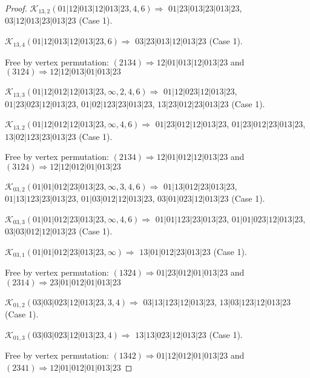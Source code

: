 \documentclass[12pt]{article}
\theoremstyle{plain}
\theoremstyle{definition}
\theoremstyle{remark}
\newcommand{\fancy}[1]{\mathcal{#1}}
\def\K{\fancy{K}}
\begin{document}
\begin{proof}
	\bigskip
	
	$\K_{13,2}(01|12|013|12|013|23,4, 6)\Rightarrow $ $01|23|013|23|013|23$, $03|12|013|23|013|23$ (Case 1).
	
	$\K_{13,4}(01|12|013|12|013|23,6)\Rightarrow $ $03|23|013|12|013|23$ (Case 1).
	
	
	
	Free by vertex permutation: $(2 1 3 4)\Rightarrow 12|01|013|12|013|23$ and $(3 1 2 4)\Rightarrow 12|12|013|01|013|23$
	
	
	
	\bigskip
	
	$\K_{13,3}(01|12|012|12|013|23,\infty,2, 4, 6)\Rightarrow $ $01|12|023|12|013|23$, $01|23|023|12|013|23$, $01|02|123|23|013|23$, $13|23|012|23|013|23$ (Case 1).
	
	$\K_{13,2}(01|12|012|12|013|23,\infty,4, 6)\Rightarrow $ $01|23|012|12|013|23$, $01|23|012|23|013|23$, $13|02|123|23|013|23$ (Case 1).
	
	
	
	Free by vertex permutation: $(2 1 3 4)\Rightarrow 12|01|012|12|013|23$ and $(3 1 2 4)\Rightarrow 12|12|012|01|013|23$
	
	
	
	\bigskip
	
	$\K_{03,2}(01|01|012|23|013|23,\infty,3, 4, 6)\Rightarrow $ $01|13|012|23|013|23$, $01|13|123|23|013|23$, $01|03|012|12|013|23$, $03|01|023|12|013|23$ (Case 1).
	
	$\K_{03,3}(01|01|012|23|013|23,\infty,4, 6)\Rightarrow $ $01|01|123|23|013|23$, $01|01|023|12|013|23$, $03|03|012|12|013|23$ (Case 1).
	
	$\K_{03,1}(01|01|012|23|013|23,\infty)\Rightarrow $ $13|01|012|23|013|23$ (Case 1).
	
	
	
	Free by vertex permutation: $(1 3 2 4)\Rightarrow 01|23|012|01|013|23$ and $(2 3 1 4)\Rightarrow 23|01|012|01|013|23$
	
	
	
	\bigskip
	
	$\K_{01,2}(03|03|023|12|013|23,3, 4)\Rightarrow $ $03|13|123|12|013|23$, $13|03|123|12|013|23$ (Case 1).
	
	$\K_{01,3}(03|03|023|12|013|23,4)\Rightarrow $ $13|13|023|12|013|23$ (Case 1).
	
	
	
	Free by vertex permutation: $(1 3 4 2)\Rightarrow 01|12|012|01|013|23$ and $(2 3 4 1)\Rightarrow 12|01|012|01|013|23$
	
	
	

\end{proof}
\end{document}
